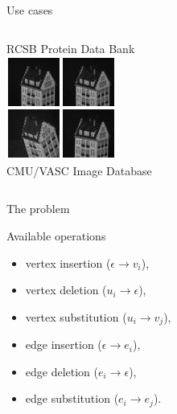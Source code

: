 \documentclass{beamer}
\begin{document}
\begin{frame}{Use cases}
\begin{columns}[t]
\begin{column}{0.5\textwidth}
      {\tiny\color{gray}RCSB Protein Data Bank} \\
      \vspace{1cm}
      \includegraphics[height=0.3\textheight]{cmu.jpg} \\
      {\tiny\color{gray}CMU/VASC Image Database}
    \end{column}
  \end{columns}
\end{frame}
\begin{frame}{The problem \cite{abu-aisheh_2016}}
  \begin{figure}
  \end{figure}
\end{frame}
\begin{frame}{Available operations}
  \begin{itemize}
  \item vertex insertion ($\epsilon \to v_i$),
  \item vertex deletion ($u_i \to \epsilon$),
  \item vertex substitution ($u_i \to v_j$),
  \item edge insertion ($\epsilon \to e_i$),
  \item edge deletion ($e_i \to \epsilon$),
  \item edge substitution ($e_i \to e_j$).
  \end{itemize}
\end{frame}
\end{document}
